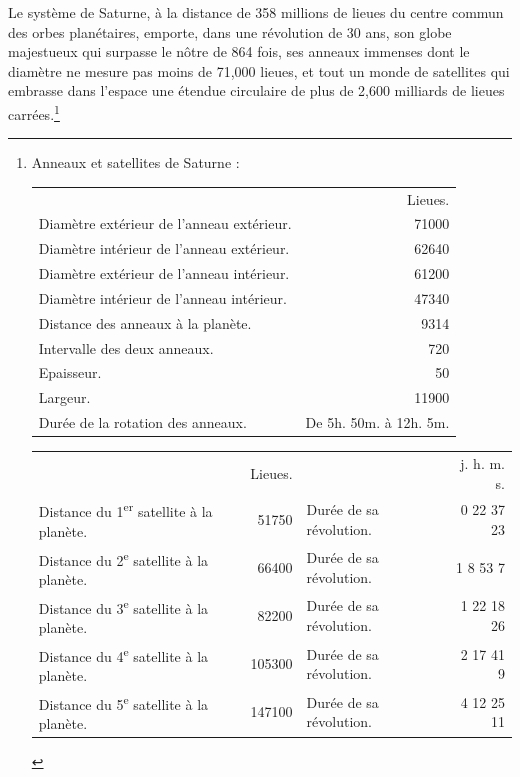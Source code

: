 \documentclass[a4paper, 11pt, oneside]{article}
\begin{document}
Le système de Saturne, à la distance de 358 millions de lieues du centre commun des orbes planétaires, emporte, dans une révolution de 30 ans, son globe majestueux qui surpasse le nôtre de 864 fois, ses anneaux immenses dont le diamètre ne mesure pas moins de 71,000 lieues, et tout un monde de satellites qui embrasse dans l'espace une étendue circulaire de plus de 2,600 milliards de lieues carrées.\footnote{Anneaux et satellites de Saturne :\\
\begin{table}[H]
    \centering
    \footnotesize
    \Fontauri
    \begin{tabular}{p{55mm} r}
        ~ & Lieues.   \\
        Diamètre extérieur de l'anneau extérieur. & 71000 \\
        Diamètre intérieur de l'anneau extérieur. & 62640 \\
        Diamètre extérieur de l'anneau intérieur. & 61200 \\
        Diamètre intérieur de l'anneau intérieur. & 47340 \\
        Distance des anneaux à la planète. & 9314 \\
        Intervalle des deux anneaux. & 720 \\
        Epaisseur. & 50 \\
        Largeur. & 11900 \\
        Durée de la rotation des anneaux. & De 5h. 50m. à 12h. 5m. \\
    \end{tabular}
\end{table}
\begin{table}[H]
    \centering
    \footnotesize
    \Fontauri
    \begin{tabular}{p{35mm} r p{30mm} r}
        ~ & Lieues. & ~ & j. h. m. s.   \\
        Distance du 1\textsuperscript{er} satellite à la planète. & 51750 & Durée de sa révolution. & 0 22 37 23   \\
        Distance du 2\textsuperscript{e} satellite à la planète. & 66400 & Durée de sa révolution. & 1 8 53 7   \\
        Distance du 3\textsuperscript{e} satellite à la planète. & 82200 & Durée de sa révolution. & 1 22 18 26   \\
        Distance du 4\textsuperscript{e} satellite à la planète. & 105300 & Durée de sa révolution. & 2 17 41 9   \\
        Distance du 5\textsuperscript{e} satellite à la planète. & 147100 & Durée de sa révolution. & 4 12 25 11   \\

\end{tabular}
\end{table}}
\end{document}
